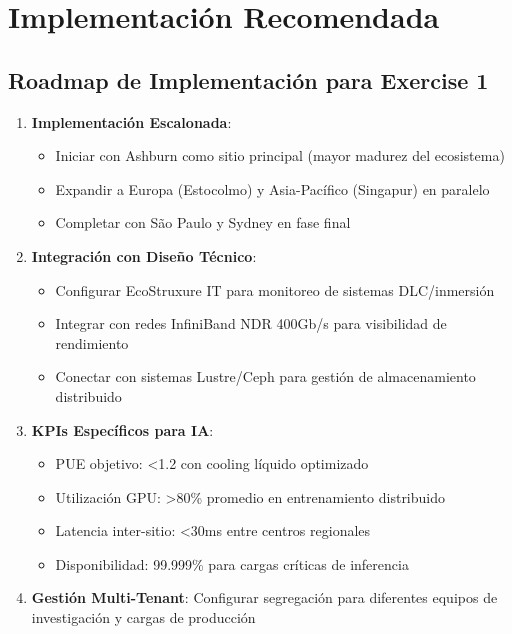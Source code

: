 \documentclass[12pt,a4paper]{article}
\begin{document}
\section{Implementación Recomendada}

\subsection{Roadmap de Implementación para Exercise 1}

\begin{enumerate}
    \item \textbf{Implementación Escalonada}:
    \begin{itemize}
        \item Iniciar con Ashburn como sitio principal (mayor madurez del ecosistema)
        \item Expandir a Europa (Estocolmo) y Asia-Pacífico (Singapur) en paralelo
        \item Completar con São Paulo y Sydney en fase final
    \end{itemize}

    \item \textbf{Integración con Diseño Técnico}:
    \begin{itemize}
        \item Configurar EcoStruxure IT para monitoreo de sistemas DLC/inmersión
        \item Integrar con redes InfiniBand NDR 400Gb/s para visibilidad de rendimiento
        \item Conectar con sistemas Lustre/Ceph para gestión de almacenamiento distribuido
    \end{itemize}

    \item \textbf{KPIs Específicos para IA}:
    \begin{itemize}
        \item PUE objetivo: <1.2 con cooling líquido optimizado
        \item Utilización GPU: >80\% promedio en entrenamiento distribuido
        \item Latencia inter-sitio: <30ms entre centros regionales
        \item Disponibilidad: 99.999\% para cargas críticas de inferencia
    \end{itemize}

    \item \textbf{Gestión Multi-Tenant}: Configurar segregación para diferentes equipos de investigación y cargas de producción
\end{enumerate}
\end{document}
